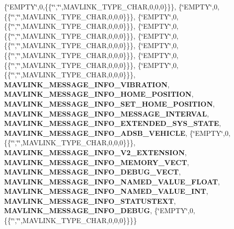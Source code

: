 \begin{DoxyCompactItemize}
\{\char`\"{}E\+M\+P\+TY\char`\"{},0,\{\{\char`\"{}\char`\"{},\char`\"{}\char`\"{},M\+A\+V\+L\+I\+N\+K\+\_\+\+T\+Y\+P\+E\+\_\+\+C\+H\+AR,0,0,0\}\}\}, \{\char`\"{}E\+M\+P\+TY\char`\"{},0,\{\{\char`\"{}\char`\"{},\char`\"{}\char`\"{},M\+A\+V\+L\+I\+N\+K\+\_\+\+T\+Y\+P\+E\+\_\+\+C\+H\+AR,0,0,0\}\}\}, \{\char`\"{}E\+M\+P\+TY\char`\"{},0,\{\{\char`\"{}\char`\"{},\char`\"{}\char`\"{},M\+A\+V\+L\+I\+N\+K\+\_\+\+T\+Y\+P\+E\+\_\+\+C\+H\+AR,0,0,0\}\}\}, \{\char`\"{}E\+M\+P\+TY\char`\"{},0,\{\{\char`\"{}\char`\"{},\char`\"{}\char`\"{},M\+A\+V\+L\+I\+N\+K\+\_\+\+T\+Y\+P\+E\+\_\+\+C\+H\+AR,0,0,0\}\}\}, \{\char`\"{}E\+M\+P\+TY\char`\"{},0,\{\{\char`\"{}\char`\"{},\char`\"{}\char`\"{},M\+A\+V\+L\+I\+N\+K\+\_\+\+T\+Y\+P\+E\+\_\+\+C\+H\+AR,0,0,0\}\}\}, \{\char`\"{}E\+M\+P\+TY\char`\"{},0,\{\{\char`\"{}\char`\"{},\char`\"{}\char`\"{},M\+A\+V\+L\+I\+N\+K\+\_\+\+T\+Y\+P\+E\+\_\+\+C\+H\+AR,0,0,0\}\}\}, \{\char`\"{}E\+M\+P\+TY\char`\"{},0,\{\{\char`\"{}\char`\"{},\char`\"{}\char`\"{},M\+A\+V\+L\+I\+N\+K\+\_\+\+T\+Y\+P\+E\+\_\+\+C\+H\+AR,0,0,0\}\}\}, \{\char`\"{}E\+M\+P\+TY\char`\"{},0,\{\{\char`\"{}\char`\"{},\char`\"{}\char`\"{},M\+A\+V\+L\+I\+N\+K\+\_\+\+T\+Y\+P\+E\+\_\+\+C\+H\+AR,0,0,0\}\}\}, \textbf{ M\+A\+V\+L\+I\+N\+K\+\_\+\+M\+E\+S\+S\+A\+G\+E\+\_\+\+I\+N\+F\+O\+\_\+\+V\+I\+B\+R\+A\+T\+I\+ON}, \textbf{ M\+A\+V\+L\+I\+N\+K\+\_\+\+M\+E\+S\+S\+A\+G\+E\+\_\+\+I\+N\+F\+O\+\_\+\+H\+O\+M\+E\+\_\+\+P\+O\+S\+I\+T\+I\+ON}, \textbf{ M\+A\+V\+L\+I\+N\+K\+\_\+\+M\+E\+S\+S\+A\+G\+E\+\_\+\+I\+N\+F\+O\+\_\+\+S\+E\+T\+\_\+\+H\+O\+M\+E\+\_\+\+P\+O\+S\+I\+T\+I\+ON}, \textbf{ M\+A\+V\+L\+I\+N\+K\+\_\+\+M\+E\+S\+S\+A\+G\+E\+\_\+\+I\+N\+F\+O\+\_\+\+M\+E\+S\+S\+A\+G\+E\+\_\+\+I\+N\+T\+E\+R\+V\+AL}, \textbf{ M\+A\+V\+L\+I\+N\+K\+\_\+\+M\+E\+S\+S\+A\+G\+E\+\_\+\+I\+N\+F\+O\+\_\+\+E\+X\+T\+E\+N\+D\+E\+D\+\_\+\+S\+Y\+S\+\_\+\+S\+T\+A\+TE}, \textbf{ M\+A\+V\+L\+I\+N\+K\+\_\+\+M\+E\+S\+S\+A\+G\+E\+\_\+\+I\+N\+F\+O\+\_\+\+A\+D\+S\+B\+\_\+\+V\+E\+H\+I\+C\+LE}, \{\char`\"{}E\+M\+P\+TY\char`\"{},0,\{\{\char`\"{}\char`\"{},\char`\"{}\char`\"{},M\+A\+V\+L\+I\+N\+K\+\_\+\+T\+Y\+P\+E\+\_\+\+C\+H\+AR,0,0,0\}\}\}, \textbf{ M\+A\+V\+L\+I\+N\+K\+\_\+\+M\+E\+S\+S\+A\+G\+E\+\_\+\+I\+N\+F\+O\+\_\+\+V2\+\_\+\+E\+X\+T\+E\+N\+S\+I\+ON}, \textbf{ M\+A\+V\+L\+I\+N\+K\+\_\+\+M\+E\+S\+S\+A\+G\+E\+\_\+\+I\+N\+F\+O\+\_\+\+M\+E\+M\+O\+R\+Y\+\_\+\+V\+E\+CT}, \textbf{ M\+A\+V\+L\+I\+N\+K\+\_\+\+M\+E\+S\+S\+A\+G\+E\+\_\+\+I\+N\+F\+O\+\_\+\+D\+E\+B\+U\+G\+\_\+\+V\+E\+CT}, \textbf{ M\+A\+V\+L\+I\+N\+K\+\_\+\+M\+E\+S\+S\+A\+G\+E\+\_\+\+I\+N\+F\+O\+\_\+\+N\+A\+M\+E\+D\+\_\+\+V\+A\+L\+U\+E\+\_\+\+F\+L\+O\+AT}, \textbf{ M\+A\+V\+L\+I\+N\+K\+\_\+\+M\+E\+S\+S\+A\+G\+E\+\_\+\+I\+N\+F\+O\+\_\+\+N\+A\+M\+E\+D\+\_\+\+V\+A\+L\+U\+E\+\_\+\+I\+NT}, \textbf{ M\+A\+V\+L\+I\+N\+K\+\_\+\+M\+E\+S\+S\+A\+G\+E\+\_\+\+I\+N\+F\+O\+\_\+\+S\+T\+A\+T\+U\+S\+T\+E\+XT}, \textbf{ M\+A\+V\+L\+I\+N\+K\+\_\+\+M\+E\+S\+S\+A\+G\+E\+\_\+\+I\+N\+F\+O\+\_\+\+D\+E\+B\+UG}, \{\char`\"{}E\+M\+P\+TY\char`\"{},0,\{\{\char`\"{}\char`\"{},\char`\"{}\char`\"{},M\+A\+V\+L\+I\+N\+K\+\_\+\+T\+Y\+P\+E\+\_\+\+C\+H\+AR,0,0,0\}\}\}\}

\end{DoxyCompactItemize}
